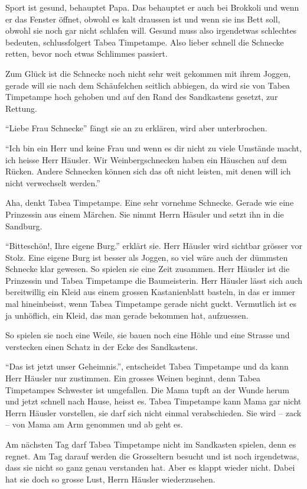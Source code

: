 Sport ist gesund, behauptet Papa. Das behauptet er auch bei Brokkoli und wenn er das Fenster öffnet, obwohl es kalt draussen ist und wenn sie ins Bett soll, obwohl sie noch gar nicht schlafen will. Gesund muss also irgendetwas schlechtes bedeuten, schlussfolgert Tabea Timpetampe. Also lieber schnell die Schnecke retten, bevor noch etwas Schlimmes passiert.

Zum Glück ist die Schnecke noch nicht sehr weit gekommen mit ihrem Joggen, gerade will sie nach dem Schäufelchen seitlich abbiegen, da wird sie von Tabea Timpetampe hoch gehoben und auf den Rand des Sandkastens gesetzt, zur Rettung. 

\enquote{Liebe Frau Schnecke} fängt sie an zu erklären, wird aber unterbrochen.

\enquote{Ich bin ein Herr und keine Frau und wenn es dir nicht zu viele Umstände macht, ich heisse Herr Häusler. Wir Weinbergschnecken haben ein Häuschen auf dem Rücken. Andere Schnecken können sich das oft nicht leisten, mit denen will ich nicht verwechselt werden.}

Aha, denkt Tabea Timpetampe. Eine sehr vornehme Schnecke. Gerade wie eine Prinzessin aus einem Märchen. Sie nimmt Herrn Häsuler und setzt ihn in die Sandburg.

\enquote{Bitteschön!, Ihre eigene Burg.} erklärt sie. Herr Häusler wird sichtbar grösser vor Stolz. Eine eigene Burg ist besser als Joggen, so viel wäre auch der dümmsten Schnecke klar gewesen. So spielen sie eine Zeit zusammen. Herr Häusler ist die Prinzessin und Tabea Timpetampe die Baumeisterin. Herr Häusler lässt sich auch bereitwillig ein Kleid aus einem grossen Kastanienblatt basteln, in das er immer mal hineinbeisst, wenn Tabea Timpetampe gerade nicht guckt. Vermutlich ist es ja unhöflich, ein Kleid, das man gerade bekommen hat, aufzuessen. 

So spielen sie noch eine Weile, sie bauen noch eine Höhle und eine Strasse und verstecken einen Schatz in der Ecke des Sandkastens.

\enquote{Das ist jetzt unser Geheimnis.}, entscheidet Tabea Timpetampe und da kann Herr Häusler nur zustimmen. Ein grosses Weinen beginnt, denn Tabea Timpetampes Schwester ist umgefallen. Die Mama tupft an der Wunde herum und jetzt schnell nach Hause, heisst es. Tabea Timpetampe kann Mama gar nicht Herrn Häusler vorstellen, sie darf sich nicht einmal verabschieden. Sie wird -- zack -- von Mama am Arm genommen und ab geht es.

Am nächsten Tag darf Tabea Timpetampe nicht im Sandkasten spielen, denn es regnet. Am Tag darauf werden die Grosseltern besucht und ist noch irgendetwas, dass sie nicht so ganz genau verstanden hat. Aber es klappt wieder nicht. Dabei hat sie doch so grosse Lust, Herrn Häusler wiederzusehen. 

